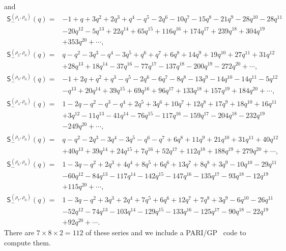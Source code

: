 \documentclass[pdftex]{sigma}
\numberwithin{equation}{section}
\begin{document}
and
\begin{align*}
\mathsf{S}_{-}^{(\rho_{1},\rho_{0})}(q)
 ={}&-1 + q + 3q^2 + 2q^3 + q^4 - q^5 - 2q^6 - 10q^7 - 15q^8 - 21q^9 - 28q^{10} - 28q^{11} \\
&  - 20q^{12}- 5q^{13} + 22q^{14} + 65q^{15} + 116q^{16} + 174q^{17} + 239q^{18} + 304q^{19}\\
&  + 353q^{20} + \cdots , \\
\mathsf{S}_{-}^{(\rho_{2},\rho_{0})}(q)
 ={} &q - q^2 - 3q^3 - q^4 - 3q^5 + q^6 + q^7 + 6q^8 + 14q^9 + 19q^{10} + 27q^{11} + 31q^{12} \\
& + 28q^{13} + 18q^{14} - 37q^{16} - 77q^{17} - 137q^{18} - 200q^{19} - 272q^{20} + \cdots , \\
\mathsf{S}_{-}^{(\rho_{3},\rho_{0})}(q)
={}&
-1 + 2q + q^2 + q^3 - q^5 - 2q^6 - 6q^7 - 8q^8 - 13q^9 - 14q^{10} - 14q^{11} - 5q^{12} \\
&  - q^{13} + 20q^{14} + 39q^{15} + 69q^{16} + 96q^{17} + 133q^{18} + 157q^{19} + 184q^{20} + \cdots , \\
\mathsf{S}_{-}^{(\rho_{4},\rho_{0})}(q)
={}&
1 - 2q - q^2 - q^3 - q^4 + 2q^5 + 3q^6 + 10q^7 + 12q^8 + 17q^9 + 18q^{10} + 16q^{11} \\
&  + 3q^{12}- 11q^{13} - 41q^{14} - 76q^{15} - 117q^{16} - 159q^{17} - 204q^{18} - 232q^{19} \\
& - 249q^{20} + \cdots , \\
\mathsf{S}_{-}^{(\rho_{5},\rho_{0})}(q)
={}&
q - q^2 - 2q^3 - 3q^4 - 3q^5 - q^6 - q^7 + 6q^8 + 11q^9 + 21q^{10} + 31q^{11} + 40q^{12} \\
&  + 40q^{13} + 39q^{14} + 24q^{15} + 7q^{16} + 52q^{17} + 112q^{18} + 188q^{19} + 279q^{20} + \cdots , \\
\mathsf{S}_{-}^{(\rho_{6},\rho_{0})}(q)
={}&
1 - 3q - q^2 + 2q^3 + 4q^4 + 8q^5 + 6q^6 + 13q^7 + 8q^8 + 3q^9 - 10q^{10} - 29q^{11} \\
&  - 60q^{12}- 84q^{13} - 117q^{14} - 142q^{15} - 147q^{16} - 135q^{17} - 93q^{18} - 12q^{19}\\
& + 115q^{20} + \cdots , \\
\mathsf{S}_{-}^{(\rho_{7},\rho_{0})}(q)
={}&
1 - 3q - q^2 + 3q^3 + 2q^4 + 7q^5 + 6q^6 + 12q^7 + 7q^8 + 3q^9 - 6q^{10} - 26q^{11} \\
&  - 52q^{12}- 74q^{13} - 103q^{14} - 129q^{15} - 133q^{16} - 125q^{17} - 90q^{18} - 22q^{19} \\
& + 92q^{20} + \cdots .
\end{align*}
There are $7\times 8\times 2=112$ of these series and we include a PARI/GP~\cite{PARI} code to compute them.
\end{document}
